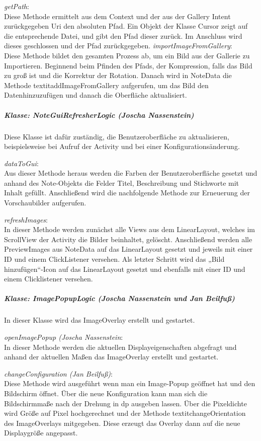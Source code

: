 \textit{getPath}:\\
Diese Methode ermittelt aus dem Context und der aus der Gallery Intent zurückgegeben Uri den absoluten Pfad. Ein Objekt der Klasse Cursor zeigt auf die entsprechende Datei, und gibt den Pfad dieser zurück. Im Anschluss wird dieses geschlossen und der Pfad zurückgegeben.
\textit{importImageFromGallery}:\\
Diese Methode bildet den gesamten Prozess ab, um ein Bild aus der Gallerie zu Importieren. Beginnend beim Pfinden des Pfads, der Kompression, falls das Bild zu groß ist und die Korrektur der Rotation. Danach wird in NoteData die Methode textit{addImageFromGallery} aufgerufen, um das Bild den Datenhinzuzufügen und danach die Oberfläche aktualisiert.

\subparagraph*{Klasse: NoteGuiRefresherLogic (Joscha Nassenstein)}
Diese Klasse ist dafür zuständig, die Benutzeroberfläche zu aktualisieren, beispielsweise bei Aufruf der Activity und bei einer Konfigurationsänderung.

\textit{dataToGui}:\\
Aus dieser Methode heraus werden die Farben der Benutzeroberfläche gesetzt und anhand des Note-Objekts die Felder Titel, Beschreibung und Stichworte mit Inhalt gefüllt. Anschließend wird die nachfolgende Methode zur Erneuerung der Vorschaubilder aufgerufen.

\textit{refreshImages}:\\
In dieser Methode werden zunächst alle Views aus dem LinearLayout, welches im ScrollView der Activity die Bilder beinhaltet, gelöscht. Anschließend werden alle PreviewImages aus NoteData auf das LinearLayout gesetzt und jeweils mit einer ID und einem ClickListener versehen. Als letzter Schritt wird das „Bild hinzufügen“-Icon auf das LinearLayout gesetzt und ebenfalls mit einer ID und einem Clicklistener versehen.

\subparagraph*{Klasse: ImagePopupLogic (Joscha Nassenstein und Jan Beilfuß)}
In dieser Klasse wird das ImageOverlay erstellt und gestartet.

\textit{openImagePopup (Joscha Nassenstein}:\\
In dieser Methode werden die aktuellen Displayeigenschaften abgefragt und anhand der aktuellen Maßen das ImageOverlay erstellt und gestartet.

\textit{changeConfiguration (Jan Beilfuß)}:\\

Diese Methode wird ausgeführt wenn man ein Image-Popup geöffnet hat und den Bildschirm öffnet. Über die neue Konfiguration kann man sich die Bildschirmmaße nach der Drehung in dp ausgeben lassen. Über die Pixeldichte wird Größe auf Pixel hochgerechnet und der Methode textit{changeOrientation} des ImageOverlays mitgegeben. Diese erzeugt das Overlay dann auf die neue Displaygröße angepasst.


